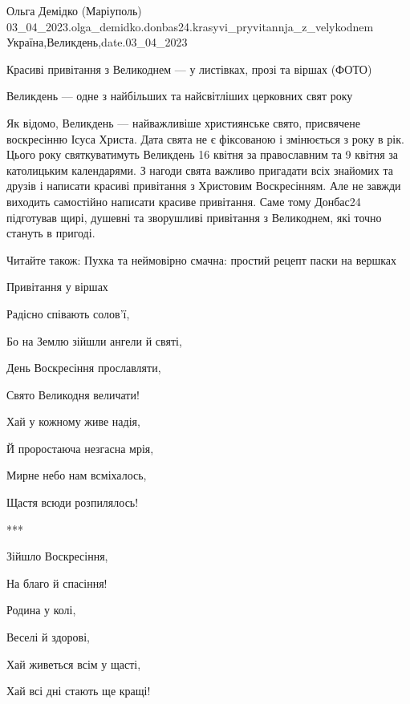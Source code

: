  
 
 
 
 

Ольга Демідко (Маріуполь)
03_04_2023.olga_demidko.donbas24.krasyvi_pryvitannja_z_velykodnem
Україна,Великдень,date.03_04_2023

Красиві привітання з Великоднем — у листівках, прозі та віршах (ФОТО)

Великдень — одне з найбільших та найсвітліших церковних свят року

Як відомо, Великдень — найважливіше християнське свято, присвячене воскресінню
Ісуса Христа. Дата свята не є фіксованою і змінюється з року в рік. Цього року
святкуватимуть Великдень 16 квітня за православним та 9 квітня за католицьким
календарями. З нагоди свята важливо пригадати всіх знайомих та друзів і
написати красиві привітання з Христовим Воскресінням. Але не завжди виходить
самостійно написати красиве привітання. Саме тому Донбас24 підготував щирі,
душевні та зворушливі привітання з Великоднем, які точно стануть в пригоді.

Читайте також: Пухка та неймовірно смачна: простий рецепт паски на вершках

Привітання у віршах

Радісно співають солов'ї,

Бо на Землю зійшли ангели й святі,

День Воскресіння прославляти,

Свято Великодня величати!

Хай у кожному живе надія,

Й проростаюча незгасна мрія,

Мирне небо нам всміхалось,

Щастя всюди розпилялось!

***

Зійшло Воскресіння,

На благо й спасіння!

Родина у колі,

Веселі й здорові,

Хай живеться всім у щасті,

Хай всі дні стають ще кращі!

